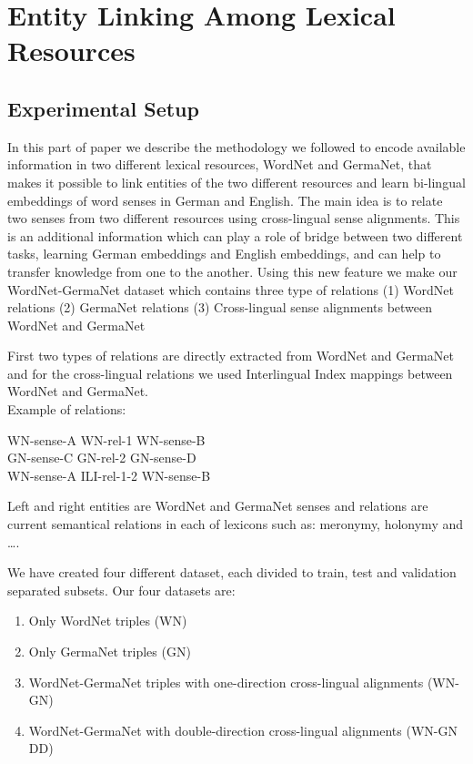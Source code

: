 \chapter{Entity Linking Among Lexical Resources}
\label{ch:exp-ent-link}

\section{Experimental Setup}
\label{sec:xkb-exp}

In this part of paper we describe the methodology we followed to encode available information 
in two different lexical resources, WordNet and GermaNet, that makes it possible to link entities of the two different
resources and learn bi-lingual 
embeddings of word senses in German and English.  
The main idea is to relate two senses from two different resources using cross-lingual sense alignments.
This is an additional information which can play a role of bridge between two
different tasks, learning German embeddings and English embeddings, and can help to transfer knowledge from one to the another.
Using this new feature we make our WordNet-GermaNet dataset which contains three type of relations 
(1) WordNet relations 
(2) GermaNet relations
(3) Cross-lingual sense alignments between WordNet and GermaNet

First two types of relations are directly extracted from WordNet and GermaNet and for the 
cross-lingual relations we used Interlingual Index mappings between WordNet and GermaNet.
\\
Example of relations:
\begin{center}
WN-sense-A \hspace{0.3in}  WN-rel-1    \hspace{0.3in}  WN-sense-B\\
GN-sense-C \hspace{0.3in}  GN-rel-2    \hspace{0.3in}  GN-sense-D\\
WN-sense-A \hspace{0.3in}  ILI-rel-1-2 \hspace{0.3in}  WN-sense-B\\
\end{center}

Left and right entities are WordNet and GermaNet senses and relations are current semantical relations in each of lexicons such as:
 meronymy, holonymy and \ldots.
 
 We have created four different dataset, each divided to train, test and validation separated subsets. Our four datasets are:
 \begin{enumerate}
 \item Only WordNet triples (WN)
 \item Only GermaNet triples (GN)
 \item WordNet-GermaNet triples with one-direction cross-lingual alignments (WN-GN)
 \item WordNet-GermaNet with double-direction cross-lingual alignments (WN-GN DD)
 \end{enumerate}
 
